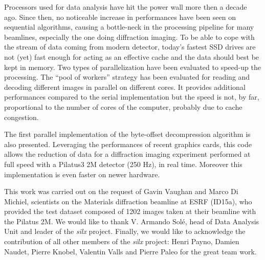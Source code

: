\documentclass[preprint]{iucr}              %
\begin{document}
Processors used for data analysis have hit the power wall more then
a  decade ago.
Since then,  no noticeable increase in performances have been seen on
sequential algorithms, causing a bottle-neck in the processing
pipeline for many beamlines, especially the one doing diffraction imaging.
To be able to cope with the stream of data coming from modern detector,
today's fastest SSD drives are not (yet) fast  enough for acting as an
effective cache and the data should best be kept in memory.
Two types of parallelization have been evaluated to speed-up the processing.
The ``pool of workers'' strategy has been evaluated for reading and decoding
different images  in parallel on different cores.
It provides additional performances compared to the serial implementation but
the speed is not, by far, proportional to the number of cores of the computer,
probably due to cache congestion.

The first parallel implementation of the byte-offset decompression 
algorithm is also presented. 
Leveraging the performances of recent graphics cards, this code allows the reduction
of data for a diffraction imaging experiment performed at full speed with
a Pilatus3 2M detector (250 Hz), in real time.
Moreover this implementation is even faster on newer hardware. 

 
This work was carried out on the request of Gavin Vaughan and Marco Di
Michiel, scientists on the Materials diffraction beamline at ESRF (ID15a), who
provided the test dataset composed of 1202 images taken at their beamline with
the Pilatus 2M.
We would like to thank V. Armando Solé, head of Data Analysis Unit and leader
of the \textit{silx} project. 
Finally, we would like to acknowledge the contribution of all other members
of the \textit{silx} project:
Henri Payno, Damien Naudet, Pierre Knobel, Valentin Valls and
Pierre Paleo for the great team work.



\end{document}
